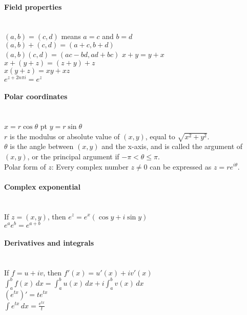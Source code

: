 \documentclass[10pt]{article}
\begin{document}
\paragraph{Field properties}\ \\
$(a,b)=(c,d)$ means $a=c$ and $b=d$\\
$(a,b)+(c,d)=(a+c,b+d)$\\
$(a,b)(c,d)=(ac-bd,ad+bc)$
$x+y=y+x$\\
$x+(y+z)=(z+y)+z$\\
$x(y+z)=xy+xz$\\
$e^{z+2n\pi i}=e^z$

\begin{addmargin}[3em]{2em}%

{\indent \paragraph{Polar coordinates}\ \\
$x = r \cos \theta$  pt $y = r \sin \theta$\\
$r$ is the modulus or absolute value of $(x,y)$, equal to $\sqrt{x^2+y^2}$.\\
$\theta$ is the angle between $(x,y)$ and the x-axis, and is called the argument of $(x,y)$,
or the principal argument if $-\pi < \theta \leq \pi$.\\
Polar form of $z$: Every complex number $z \neq 0$ can be expressed as $z=re^{i\theta}$.}

\end{addmargin}


\paragraph{Complex exponential}\ \\
If $z=(x,y)$, then $e^z = e^x(\cos y + i \sin y)$\\
$e^ae^b=e^{a+b}$

\paragraph{Derivatives and integrals}\ \\
If $f=u+iv$, then $f'(x)=u'(x)+iv'(x)$\\
$\int_a^bf(x)\,dx=\int_a^bu(x)\,dx+i\int_a^bv(x)\,dx$\\
$(e^{tx})'=te^{tx}$\\
$\int e^{tx}\,dx=\frac{e^{tx}}{t}$
\end{document}

